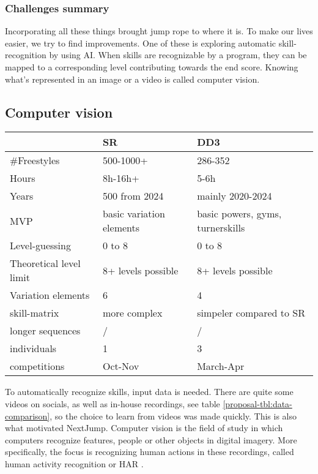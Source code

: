 \subsubsection{Challenges summary}
Incorporating all these things brought jump rope to where it is. To make our lives easier, we try to find improvements. One of these is exploring automatic skill-recognition by using AI. When skills are recognizable by a program, they can be mapped to a corresponding level contributing towards the end score. Knowing what's represented in an image or a video is called computer vision. %

\subsection{Computer vision}
\label{proposal-subsec:literature-computer-vision}

\begin{table*}[t]
    \centering
    \begin{tabular}{|l|l|l|}
        \hline
        & SR & DD3 \\ \hline
        \#Freestyles & 500-1000+ & 286-352 \\ \hline
        Hours & 8h-16h+ & 5-6h \\ \hline
        Years & 500 from 2024 & mainly 2020-2024 \\ \hline
        MVP & basic variation elements & basic powers, gyms, turnerskills \\ \hline
        Level-guessing & 0 to 8 & 0 to 8 \\ \hline
        Theoretical level limit & 8+ levels possible & 8+ levels possible \\ \hline
        Variation elements & 6 & 4 \\ \hline
        skill-matrix & more complex & simpeler compared to SR \\ \hline
        longer sequences & / & / \\ \hline
        individuals & 1 & 3 \\ \hline
        competitions & Oct-Nov & March-Apr \\ \hline
    \end{tabular}
    \caption{Data comparison}
    \label{proposal-tbl:data-comparison}
\end{table*}

To automatically recognize skills, input data is needed. There are quite some videos on socials, as well as in-house recordings, see table \ref{proposal-tbl:data-comparison}, so the choice to learn from videos was made quickly. This is also what motivated NextJump.
Computer vision is the field of study in which computers recognize features, people or other objects in digital imagery. More specifically, the focus is recognizing human actions in these recordings, called human activity recognition or HAR \autocite{Pareek_2020}.


